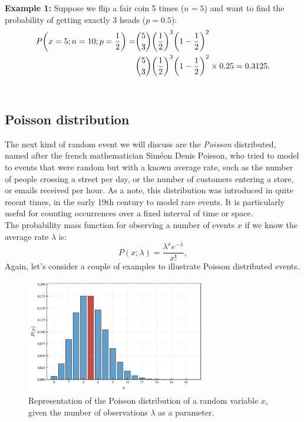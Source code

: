 \documentclass{book}
\begin{document}
\textbf{Example 1:} Suppose we flip a fair coin 5 times ($n=5$) and want to find the probability of getting exactly 3 heads ($p=0.5$):
\begin{align}
    P\bigg(x=5; n = 10; p = \frac{1}{2}\bigg) = &\binom{5}{3} \bigg(\frac{1}{2}\bigg)^3 \bigg(1 - \frac{1}{2}\bigg)^2  \notag \\
    &\binom{5}{3} \bigg(\frac{1}{2}\bigg)^3 \bigg(1 - \frac{1}{2}\bigg)^2  \notag \times 0.25 = 0.3125.
\end{align}\\

\newpage

\subsection{Poisson distribution}

The next kind of random event we will discuss are the \textit{Poisson} distributed, named after the french mathematician Sim\'eon Denis Poisson, who tried to model to events that were random but with a known average rate, such as the number of people crossing a street per day, or the number of customers entering a store, or emails received per hour.
As a note, this distribution was introduced in quite recent times, in the early 19th century to model rare events. It is particularly useful for counting occurrences over a fixed interval of time or space.\\

The probability mass function for observing a number of events $x$ if we know the average rate $\lambda$ is:
\begin{equation}
    P(x; \lambda) = \frac{\lambda^x e^{-\lambda}}{x!},
\end{equation}
Again, let's consider a couple of examples to illustrate Poisson distributed events.

\begin{figure}[ht]
    \centering
    \includegraphics[width=0.7\textwidth]{figures/chapter2/poisson_1.png}
    \caption{Representation of the Poisson distribution of a random variable $x$, given the number of observations $\lambda$ as a parameter.}
    \label{fig:poisson1}
\end{figure}
\end{document}
